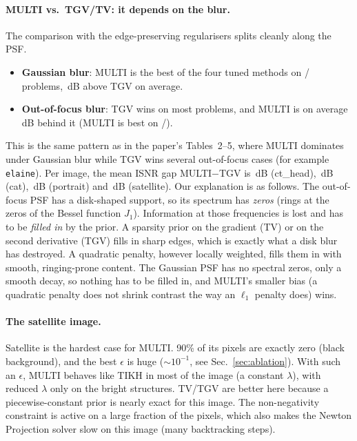 \paragraph{MULTI vs.\ TGV/TV: it depends on the blur.}
The comparison with the edge-preserving regularisers splits cleanly along the PSF.
\begin{itemize}[leftmargin=*,itemsep=1pt]
\item \textbf{Gaussian blur}: MULTI is the best of the four tuned methods on
  \nMainWinsGauss/\nMainNGauss{} problems, \nMainGainTGVGauss\,dB above TGV on average.
\item \textbf{Out-of-focus blur}: TGV wins on most problems, and MULTI is on
  average \nMainGainTGVOof\,dB behind it (MULTI is best on \nMainWinsOof/\nMainNOof).
\end{itemize}
This is the same pattern as in the paper's Tables~2--5, where MULTI dominates under
Gaussian blur while TGV wins several out-of-focus cases (for example
\texttt{elaine}). Per image, the mean ISNR gap MULTI$-$TGV is
\nGainTGVCthead\,dB (ct\_head), \nGainTGVCat\,dB (cat), \nGainTGVPortrait\,dB (portrait)
and \nGainTGVSatellite\,dB (satellite).
Our explanation is as follows. The out-of-focus PSF has a disk-shaped support,
so its spectrum has \emph{zeros} (rings at the zeros of the Bessel function $J_1$).
Information at those frequencies is lost and has to be \emph{filled in} by the
prior. A sparsity prior on the gradient (TV) or on the second derivative (TGV)
fills in sharp edges, which is exactly what a disk blur has destroyed. A quadratic
penalty, however locally weighted, fills them in with smooth, ringing-prone
content. The Gaussian PSF has no spectral zeros, only a smooth decay, so
nothing has to be filled in, and MULTI's smaller bias (a quadratic penalty does not shrink
contrast the way an $\ell_1$ penalty does) wins.

\paragraph{The satellite image.}
Satellite is the hardest case for MULTI. 90\% of its pixels are exactly zero (black
background), and the best $\epsilon$ is huge ($\sim\!10^{-1}$, see Sec.~\ref{sec:ablation}).
With such an $\epsilon$, MULTI behaves like TIKH in most of the image (a constant
$\lambda$), with reduced $\lambda$ only on the bright structures. TV/TGV are
better here because a piecewise-constant prior is nearly exact for this image.
The non-negativity constraint is active on a large fraction of the pixels, which
also makes the Newton Projection solver slow on this image (many backtracking steps).

